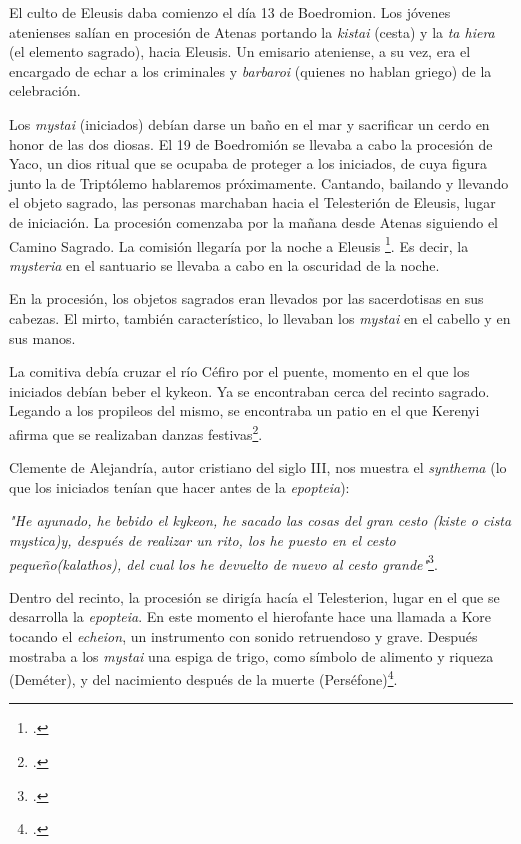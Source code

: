 El culto de Eleusis daba comienzo el día 13 de Boedromion. Los jóvenes atenienses salían en procesión de Atenas portando la \textit{kistai} (cesta) y la \textit{ta hiera} (el elemento sagrado), hacia Eleusis. Un emisario ateniense, a su vez, era el encargado de echar a los criminales y \textit{barbaroi} (quienes no hablan griego) de la celebración. 

Los \textit{mystai} (iniciados) debían darse un baño en el mar y sacrificar un cerdo en honor de las dos diosas. El 19 de Boedromión se llevaba a cabo la procesión de Yaco, un dios ritual que se ocupaba de proteger a los iniciados, de cuya figura junto la de Triptólemo hablaremos próximamente. 
Cantando, bailando y llevando el objeto sagrado, las personas marchaban hacia el Telesterión de Eleusis, lugar de iniciación. La procesión comenzaba por la mañana desde Atenas siguiendo el Camino Sagrado. La comisión llegaría por la noche a Eleusis \footcite[84]{kerenyiEleusisImagenArquetipica2004}. Es decir, la \textit{mysteria} en el santuario se llevaba a cabo en la oscuridad de la noche.

En la procesión, los objetos sagrados eran llevados por las sacerdotisas en sus cabezas. El mirto, también característico,  lo llevaban los \textit{mystai} en el cabello y en sus manos.

La comitiva debía cruzar el río Céfiro por el puente, momento en el que los iniciados debían beber el kykeon. Ya se encontraban cerca del recinto sagrado. Legando a los propileos del mismo, se encontraba un patio en el que Kerenyi afirma que se realizaban danzas festivas\footcite[89]{kerenyiEleusisImagenArquetipica2004}.

Clemente de Alejandría, autor cristiano del siglo III, nos muestra el \textit{synthema} (lo que los iniciados tenían que hacer antes de la \textit{epopteia}): 

\textit{"He ayunado, he bebido el \textit{kykeon}, he sacado las cosas del gran cesto (\textit{kiste} o \textit{cista mystica})y, después de realizar un rito, los he puesto en el cesto pequeño(\textit{kalathos}), del cual los he devuelto de nuevo al cesto grande"}\footcite[68-69]{clementedealejandriaProtrerpico2008}.

Dentro del recinto, la procesión se dirigía hacía el Telesterion, lugar en el que se desarrolla la \textit{epopteia}. En este momento el hierofante hace una llamada a Kore tocando el \textit{echeion}, un instrumento con sonido retruendoso y grave. Después mostraba a los \textit{mystai} una espiga de trigo, como símbolo de alimento y riqueza (Deméter), y del nacimiento después de la muerte (Perséfone)\footcite[113]{kerenyiEleusisImagenArquetipica2004}.

